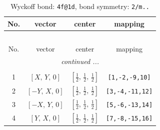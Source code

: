 \documentclass[fleqn,8pt]{jsarticle}
\begin{document}
\renewcommand{\arraystretch}{1.2}
\begin{longtable}{cccc}
\caption{Wyckoff bond: {\tt 4f@1d}, bond symmetry: {\tt 2/m..}}
 \\
 \hline \hline
No. & vector & center & mapping \\ \hline \endfirsthead

\multicolumn{3}{l}{\tablename\ \thetable{}} \\
 \hline \hline
No. & vector & center & mapping \\ \hline \endhead

 \hline \hline
\multicolumn{3}{r}{\footnotesize\it continued ...} \\ \endfoot

 \hline \hline
\multicolumn{3}{r}{} \\ \endlastfoot

1 & $\left[ X,\, Y,\, 0 \right]$ & $\left[ \frac{1}{2},\, \frac{1}{2},\, \frac{1}{2} \right]$ & {\tt [1,-2,-9,10]} \\ \hline
2 & $\left[ - Y,\, X,\, 0 \right]$ & $\left[ \frac{1}{2},\, \frac{1}{2},\, \frac{1}{2} \right]$ & {\tt [3,-4,-11,12]} \\ \hline
3 & $\left[ - X,\, Y,\, 0 \right]$ & $\left[ \frac{1}{2},\, \frac{1}{2},\, \frac{1}{2} \right]$ & {\tt [5,-6,-13,14]} \\ \hline
4 & $\left[ Y,\, X,\, 0 \right]$ & $\left[ \frac{1}{2},\, \frac{1}{2},\, \frac{1}{2} \right]$ & {\tt [7,-8,-15,16]} \\
\end{longtable}
\renewcommand{\arraystretch}{1.2}
\end{document}
